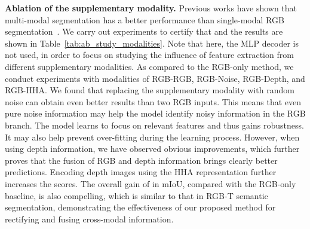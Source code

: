 \documentclass[journal]{IEEEtran}
\begin{document}
\noindent\textbf{Ablation of the supplementary modality.}
Previous works have shown that multi-modal segmentation has a better performance than single-modal RGB segmentation~\cite{hu2019acnet}. We carry out experiments to certify that and the results are shown in Table~\ref{tab:ab_study_modalities}.
Note that here, the MLP decoder is not used, in order to focus on studying the influence of feature extraction from different supplementary modalities.
As compared to the RGB-only method, we conduct experiments with modalities of RGB-RGB, RGB-Noise, RGB-Depth, and RGB-HHA. We found that replacing the supplementary modality with random noise can obtain even better results than two RGB inputs. 
This means that even pure noise information may help the model identify noisy information in the RGB branch. The model learns to focus on relevant features and thus gains robustness. It may also help prevent over-fitting during the learning process.
However, when using depth information, we have observed obvious improvements, which further proves that the fusion of RGB and depth information brings clearly better predictions.
Encoding depth images using the HHA representation further increases the scores.
The overall gain of  in mIoU, compared with the RGB-only baseline, is also compelling, which is similar to that in RGB-T semantic segmentation, demonstrating the effectiveness of our proposed method for rectifying and fusing cross-modal information.
\begin{table}[h]
\begin{center}
    \caption{\textsc{Ablation of the supplementary modality on NYU Depth V2 \textit{test} set.}}
    \label{tab:ab_study_modalities}
     \end{center}
\end{table}
\end{document}
